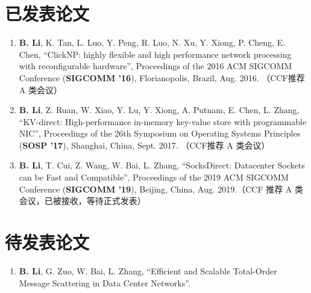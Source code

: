 
\begin{publications}

\section*{已发表论文}

\begin{enumerate}
\item \textbf{B. Li}, K. Tan, L. Luo, Y. Peng, R. Luo, N. Xu, Y. Xiong, P. Cheng, E. Chen, ``ClickNP: highly flexible and high performance network processing with reconfigurable hardware'', Proceedings of the 2016 ACM SIGCOMM Conference (\textbf{SIGCOMM '16}), Florianopolis, Brazil, Aug. 2016. （CCF推荐 A 类会议）
\item \textbf{B. Li}, Z. Ruan, W. Xiao, Y. Lu, Y. Xiong, A. Putnam, E. Chen, L. Zhang, ``KV-direct: High-performance in-memory key-value store with programmable NIC'', Proceedings of the 26th Symposium on Operating Systems Principles (\textbf{SOSP '17}), Shanghai, China, Sept. 2017. （CCF推荐 A 类会议）
\item \textbf{B. Li}, T. Cui, Z. Wang, W. Bai, L. Zhang, ``SocksDirect: Datacenter Sockets can be Fast and Compatible'', Proceedings of the 2019 ACM SIGCOMM Conference (\textbf{SIGCOMM '19}), Beijing, China, Aug. 2019.（CCF 推荐 A 类会议，已被接收，等待正式发表）
\end{enumerate}

\section*{待发表论文}

\begin{enumerate}
\item \textbf{B. Li}, G. Zuo, W. Bai, L. Zhang, ``Efficient and Scalable Total-Order Message Scattering in Data Center Networks''.
\end{enumerate}


\end{publications}
